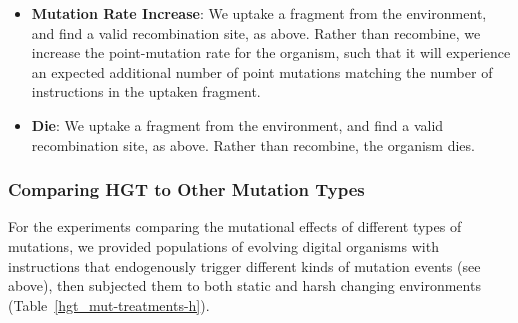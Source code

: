 \documentclass[PhD]{msu-thesis}
\begin{document}
\begin{itemize}
	\item \textbf{Mutation Rate Increase}: We uptake a fragment from the environment, and find a valid recombination site, as above. Rather than recombine, we increase the point-mutation rate for the organism, such that it will experience an expected additional number of point mutations matching the number of instructions in the uptaken fragment.

	\item \textbf{Die}: We uptake a fragment from the environment, and find a valid recombination site, as above. Rather than recombine, the organism dies.	
\end{itemize}	

\subsubsection{Comparing HGT to Other Mutation Types}

For the experiments comparing the mutational effects of different types of mutations, we provided populations of evolving digital organisms with instructions that endogenously trigger different kinds of mutation events (see above), then subjected them to both static and harsh changing environments (Table~\ref{hgt_mut-treatments-h}).  
\end{document}
